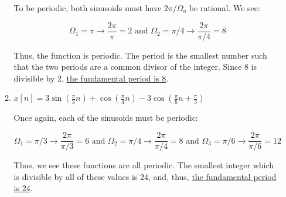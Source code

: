 \begin{enumerate}
\begin{enumerate}
        To be periodic, both sinusoids must have $2\pi/\Omega_o$ be rational. We see:

        $$\Omega_1=\pi\to\frac{2\pi}{\pi}=2\text{ and }\Omega_2=\pi/4\to\frac{2\pi}{\pi/4}=8$$

        Thus, the function is periodic. The period is the smallest number such that the two periods are a common divisor of the integer. Since 8 is divisible by 2, \underline{the fundamental period is 8}.

      \item $x[n]=3\sin\left( \frac{\pi}{3}n \right)+\cos\left( \frac{\pi}{4}n \right)-3\cos\left( \frac{\pi}{6}n+\frac{\pi}{3} \right)$ 

        Once again, each of the sinusoids must be periodic:

        $$\Omega_1=\pi/3\to\frac{2\pi}{\pi/3}=6\text{ and }\Omega_2=\pi/4\to\frac{2\pi}{\pi/4}=8\text{ and }\Omega_3=\pi/6\to\frac{2\pi}{\pi/6}=12$$

        Thus, we see these functions are all periodic. The smallest integer which is divisible by all of these values is 24, and, thus, \underline{the fundamental period is 24}.

    \end{enumerate}

\end{enumerate}



